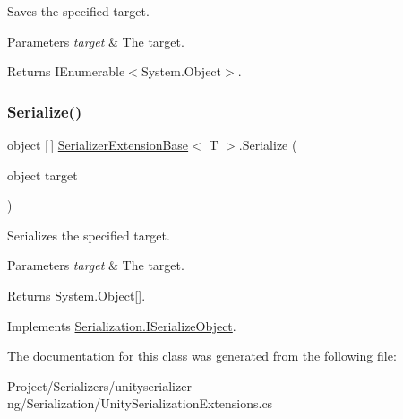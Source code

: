 Saves the specified target. 


\begin{DoxyParams}{Parameters}
{\em target} & The target.\\
\hline
\end{DoxyParams}
\begin{DoxyReturn}{Returns}
I\+Enumerable$<$System.\+Object$>$.
\end{DoxyReturn}
\mbox{\label{class_serializer_extension_base_affe527ff9e902bb2eeaa37ec1a9d2f19}} 
\subsubsection{\texorpdfstring{Serialize()}{Serialize()}}
{\footnotesize\ttfamily object \mbox{[}$\,$\mbox{]} \hyperlink{class_serializer_extension_base}{Serializer\+Extension\+Base}$<$ T $>$.Serialize (\begin{DoxyParamCaption}\item[{object}]{target }\end{DoxyParamCaption})\hspace{0.3cm}{\ttfamily [inline]}}



Serializes the specified target. 


\begin{DoxyParams}{Parameters}
{\em target} & The target.\\
\hline
\end{DoxyParams}
\begin{DoxyReturn}{Returns}
System.\+Object\mbox{[}\mbox{]}.
\end{DoxyReturn}


Implements \hyperlink{interface_serialization_1_1_i_serialize_object_a4e84ab8859d2e9921ee7d4d0eda0da97}{Serialization.\+I\+Serialize\+Object}.



The documentation for this class was generated from the following file\+:\begin{DoxyCompactItemize}
\item 
Project/\+Serializers/unityserializer-\/ng/\+Serialization/Unity\+Serialization\+Extensions.\+cs\end{DoxyCompactItemize}
